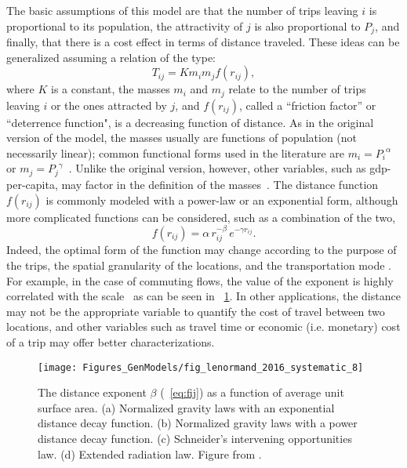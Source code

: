 The basic assumptions of this model are that the number of trips leaving $i$ is proportional to its population,  the attractivity of $j$ is also proportional to $P_j$, and finally, that there is a cost effect in terms of distance traveled. These ideas can be generalized assuming a relation of the type:
\begin{equation}
T_{ij} = K m_i m_j f(r_{ij}) ,
\label{eq:grav}
\end{equation}
where $K$ is a constant, the masses $m_i$ and $m_j$ relate to the number of trips leaving $i$ or the ones attracted by $j$, and $f(r_{ij})$, called a ``friction factor'' or ``deterrence function", is a decreasing function of distance. As in the original version of the model, the masses usually are functions of population (not necessarily linear); common functional forms used in the literature are  $m_i = {P_i}^\alpha$ or $m_j = {P_j}^\gamma$~\cite{ortuzar_2011_modeling}. Unlike the original version, however, other variables, such as gdp-per-capita, may factor in the definition of the masses~\cite{mccullogh_1989_generalized,li_2011_validation}. The distance function $f(r_{ij})$ is commonly modeled with a power-law or an exponential form, although more complicated functions can be considered, such as a combination of the two, 
\begin{equation}
f(r_{ij}) = \alpha \, r_{ij}^{-\beta} \, e^{- \gamma r_{ij}}.
\label{eq:fij}
\end{equation} 
Indeed, the optimal form of the function  may change according to the purpose of the trips, the spatial granularity of the locations, and the transportation mode \cite{barthelemy_2011_spatial}. For example, in the case of commuting flows, the value of the exponent is highly correlated with the scale~\cite{lenormand_2012_universal,lenormand_2015_systematic} as can be seen in \figurename~\ref{fig:systematic}. In other  applications, the distance may not be the appropriate variable to quantify the cost of travel between two locations, and other variables such as travel time or economic (i.e. monetary) cost of a trip may offer better characterizations.
\begin{figure}[t!]
  \centering
 \texttt{[image: Figures\_GenModels/fig\_lenormand\_2016\_systematic\_8]}
  \caption{The distance exponent $\beta$ (\equationname~\eqref{eq:fij}) as a function of average unit surface area. (a) Normalized gravity laws with an exponential distance decay function. (b) Normalized gravity laws with a power distance decay function. (c) Schneider's intervening opportunities law. (d) Extended radiation law. Figure from \cite{lenormand_2015_systematic}.}
\label{fig:systematic}
\end{figure}

